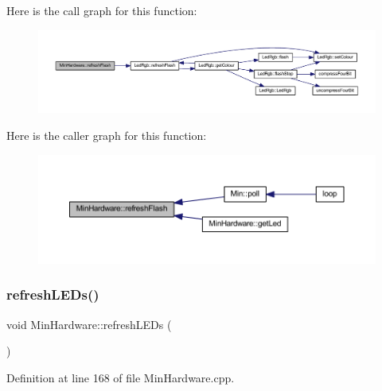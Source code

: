 Here is the call graph for this function\+:
\nopagebreak
\begin{figure}[H]
\begin{center}
\leavevmode
\includegraphics[width=350pt]{class_min_hardware_a22017d021942bf72850a338b1522d5c2_cgraph}
\end{center}
\end{figure}
Here is the caller graph for this function\+:
\nopagebreak
\begin{figure}[H]
\begin{center}
\leavevmode
\includegraphics[width=350pt]{class_min_hardware_a22017d021942bf72850a338b1522d5c2_icgraph}
\end{center}
\end{figure}
\mbox{\label{class_min_hardware_a84e0d11e73681ef8b7a7e90628b827ab}} 
\subsubsection{\texorpdfstring{refresh\+L\+E\+Ds()}{refreshLEDs()}}
{\footnotesize\ttfamily void Min\+Hardware\+::refresh\+L\+E\+Ds (\begin{DoxyParamCaption}{ }\end{DoxyParamCaption})}



Definition at line 168 of file Min\+Hardware.\+cpp.


